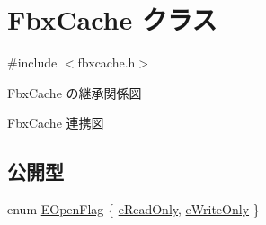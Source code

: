 \hypertarget{class_fbx_cache}{}\section{Fbx\+Cache クラス}
\label{class_fbx_cache}


{\ttfamily \#include $<$fbxcache.\+h$>$}



Fbx\+Cache の継承関係図


Fbx\+Cache 連携図
\subsection*{公開型}
\begin{DoxyCompactItemize}
\item 
enum \hyperlink{class_fbx_cache_a92f455159736ec2cdc0c282af9dbd139}{E\+Open\+Flag} \{ \hyperlink{class_fbx_cache_a92f455159736ec2cdc0c282af9dbd139acfeade2d8bab8a3b915f8064991cc007}{e\+Read\+Only}, 
\hyperlink{class_fbx_cache_a92f455159736ec2cdc0c282af9dbd139af48325666196336ed9c672386686ef63}{e\+Write\+Only}
 \}
\end{DoxyCompactItemize}
